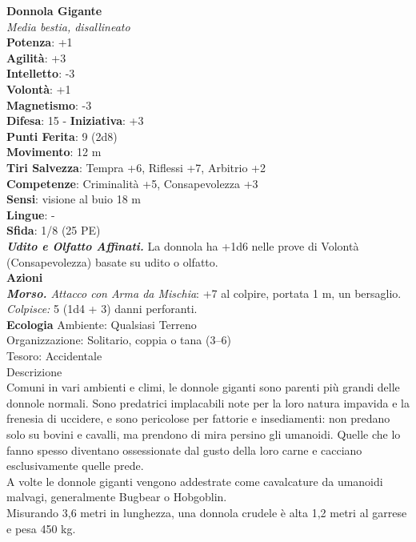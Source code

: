\begin{multicols}{2}
\medskip\textbf{Donnola Gigante}\\
\emph{Media bestia, disallineato}\\
\textbf{Potenza}: +1\\
\textbf{Agilità}: +3\\
\textbf{Intelletto}: -3\\
\textbf{Volontà}: +1\\
\textbf{Magnetismo}: -3\\
\textbf{Difesa}: 15 - \textbf{Iniziativa}: +3\\
\textbf{Punti Ferita}: 9 (2d8)\\
\textbf{Movimento}: 12 m\\
\textbf{Tiri Salvezza}:  Tempra +6, Riflessi +7, Arbitrio +2 \\
\textbf{Competenze}: Criminalità +5, Consapevolezza +3\\
\textbf{Sensi}: visione al buio 18 m\\
\textbf{Lingue}: -\\
\textbf{Sfida}: 1/8 (25 PE)\smallskip\\
\emph{\textbf{Udito e Olfatto Affinati.}} La donnola ha +1d6 nelle prove di Volontà (Consapevolezza) basate su udito o olfatto.\\
\smallskip\textbf{Azioni}\\
\emph{\textbf{Morso.} Attacco con Arma da Mischia}: +7 al colpire, portata 1 m, un bersaglio.\\
\emph{Colpisce:} 5 (1d4 + 3) danni perforanti.\\
\textbf{Ecologia}
Ambiente: Qualsiasi Terreno\\
Organizzazione: Solitario, coppia o tana (3–6)\\
Tesoro: Accidentale\\
Descrizione\\

Comuni in vari ambienti e climi, le donnole giganti sono parenti più grandi delle donnole normali. Sono predatrici implacabili note per la loro natura impavida e la frenesia di uccidere, e sono pericolose per fattorie e insediamenti: non predano solo su bovini e cavalli, ma prendono di mira persino gli umanoidi. Quelle che lo fanno spesso diventano ossessionate dal gusto della loro carne e cacciano esclusivamente quelle prede.\\
A volte le donnole giganti vengono addestrate come cavalcature da umanoidi malvagi, generalmente Bugbear o Hobgoblin.\\
Misurando 3,6 metri in lunghezza, una donnola crudele è alta 1,2 metri al garrese e pesa 450 kg. \\


\end{multicols}
